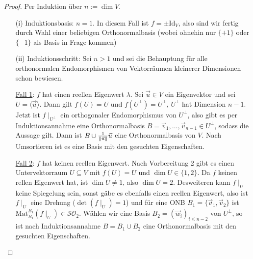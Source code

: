 \documentclass{report}
\newcommand*{\newpar}{\par\vspace{\baselineskip}\noindent}
\newcommand{\ul}[1]{\underline{#1}}
\renewcommand{\vu}{\vec{u}}
\newcommand{\vv}{\vec{v}}
\newcommand{\vw}{\vec{w}}
\newcommand{\Mat}[3]{\text{Mat}^{#1}_{#2}\left(#3\right)}
\newcommand{\Id}{\text{Id}}
\begin{document}
\begin{proof}
 Per Induktion über $n := \dim V$.
 \begin{enumerate}
  \item[(i)] Induktionsbasis: $n = 1$. In diesem Fall ist $f = \pm \Id_V$, also sind wir fertig durch Wahl einer beliebigen Orthonormalbasis (wobei ohnehin nur $\{+1\}$ oder $\{-1\}$ als Basis in Frage kommen)
  \item[(ii)] Induktionsschritt: Sei $n > 1$ und sei die Behauptung für alle orthonormalen Endomorphismen von Vektorräumen kleinerer Dimensionen schon bewiesen.
  \newpar
  \ul{Fall 1}: $f$ hat einen reellen Eigenwert $\lambda$. Sei $\vu \in V$ ein Eigenvektor und sei $U = \langle \vu \rangle$. Dann gilt $f(U) = U$ und $f(U^\bot) = U^\bot$, $U^\bot$ hat Dimension $n - 1$. Jetzt ist $f \mid_{U^\bot}$ ein orthogonaler Endomorphismus von $U^\bot$, also gibt es per Induktionsannahme eine Orthonormalbasis $B = \vv_1, \hdots, \vv_{n-1} \in U^\bot$, sodass die Aussage gilt. Dann ist $B \cup \frac{1}{\norm{\vu}}\vu$ eine Orthonormalbasis von $V$. Nach Umsortieren ist es eine Basis mit den gesuchten Eigenschaften.
  \newpar
  \ul{Fall 2}: $f$ hat keinen reellen Eigenwert. Nach Vorbereitung 2 gibt es einen Untervektorraum $U \subseteq V$ mit $f(U) = U$ und $\dim U \in \{1,2\}$. Da $f$ keinen rellen Eigenwert hat, ist $\dim U \neq 1$, also $\dim U = 2$. Desweiteren kann $f \mid_U$ keine Spiegelung sein, sonst gäbe es ebenfalls einen reellen Eigenwert, also ist $f \mid_U$ eine Drehung ($\det (f \mid_U) = 1$) und für eine ONB $B_1 = \{\vv_1, \vv_2\}$ ist $\Mat{B_1}{B_1}{f \mid_U} \in \mathcal{SO}_2$. Wählen wir eine Basis $B_2 = (\vw_i)_{i \leq n-2}$ von $U^\bot$, so ist nach Induktionsannahme $B = B_1 \cup B_2$ eine Orthonormalbasis mit den gesuchten Eigenschaften.
 \end{enumerate}
\end{proof}
\end{document}
